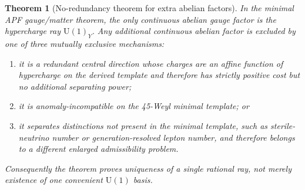 \documentclass[11pt]{article}
\newtheorem{theorem}{Theorem}[section]
\theoremstyle{definition}
\newcommand{\U}{\mathrm{U}}
\begin{document}
\begin{theorem}[No-redundancy theorem for extra abelian factors]
\label{thm:no_extra_U1_v34}
In the minimal APF gauge/matter theorem, the only continuous abelian gauge
factor is the hypercharge ray $\U(1)_Y$.  Any additional continuous abelian
factor is excluded by one of three mutually exclusive mechanisms:
\begin{enumerate}[nosep,label=(\roman*)]
  \item it is a redundant central direction whose charges are an affine
  function of hypercharge on the derived template and therefore has strictly
  positive cost but no additional separating power;
  \item it is anomaly-incompatible on the 45-Weyl minimal template; or
  \item it separates distinctions not present in the minimal template, such as
  sterile-neutrino number or generation-resolved lepton number, and therefore
  belongs to a different enlarged admissibility problem.
\end{enumerate}
Consequently the theorem proves uniqueness of a single rational ray, not merely
existence of one convenient $\U(1)$ basis.
\end{theorem}
\end{document}
